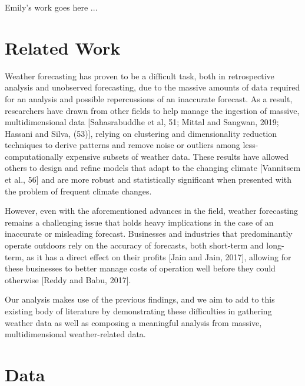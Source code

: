 \documentclass[conference]{IEEEtran}
\begin{document}
Emily's work goes here ...

\section{Related Work}

Weather forecasting has proven to be a difficult task, both in retrospective analysis and unobserved forecasting, due to the massive amounts of data required for an analysis and possible repercussions of an inaccurate forecast. As a result, researchers have drawn from other fields to help manage the ingestion of massive, multidimensional data [Sahasrabuddhe et al, 51; Mittal and Sangwan, 2019; Hassani and Silva, (53)], relying on clustering and dimensionality reduction techniques to derive patterns and remove noise or outliers among less-computationally expensive subsets of weather data. These results have allowed others to design and refine models that adapt to the changing climate [Vannitsem et al., 56] and are more robust and statistically significant when presented with the problem of frequent climate changes.

However, even with the aforementioned advances in the field, weather forecasting remains a challenging issue that holds heavy implications in the case of an inaccurate or misleading forecast. Businesses and industries that predominantly operate outdoors rely on the accuracy of forecasts, both short-term and long-term, as it has a direct effect on their profits [Jain and Jain, 2017], allowing for these businesses to better manage costs of operation well before they could otherwise [Reddy and Babu, 2017].

Our analysis makes use of the previous findings, and we aim to add to this existing body of literature by demonstrating these difficulties in gathering weather data as well as composing a meaningful analysis from massive, multidimensional weather-related data.

\section{Data}
\end{document}
